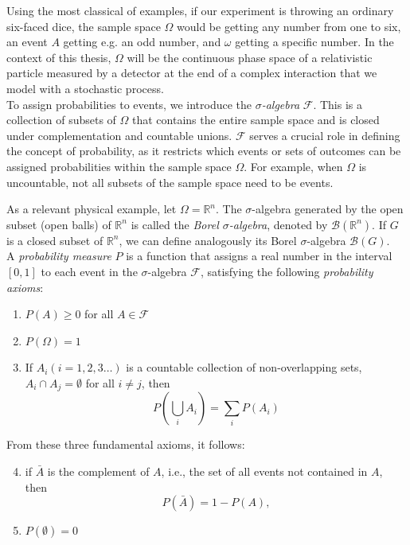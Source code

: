 \documentclass[a4paper,12pt]{book}
\begin{document}
Using the most classical of examples, if our experiment is throwing an ordinary six-faced dice, the sample space $\Omega$ would be getting any number from one to six, an event $A$ getting e.g. an odd number, and $\omega$ getting a specific number. In the context of this thesis, $\Omega$ will be the continuous phase space of a relativistic particle measured by a detector at the end of a complex interaction that we model with a stochastic process. \\

To assign probabilities to events, we introduce the \textit{$\sigma$-algebra} $\mathcal{F}$. This is a collection of subsets of $\Omega$ that contains the entire sample space and is closed under complementation and countable unions. $\mathcal{F}$ serves a crucial role in defining the concept of probability, as it restricts which events or sets of outcomes can be assigned probabilities within the sample space $\Omega$. For example, when $\Omega$ is uncountable, not all subsets of the sample space need to be events. 

As a relevant physical example, let $\Omega = \mathbb{R}^n $. The $\sigma$-algebra generated by the open subset (open balls) of $\mathbb{R}^n$ is called the \textit{Borel $\sigma$-algebra}, denoted by  $\mathcal{B}(\mathbb{R}^n)$. If $G$ is a closed subset of $\mathbb{R}^n$, we can define analogously its Borel $\sigma$-algebra $\mathcal{B}(G)$.\\


A \textit{probability measure} $P$ is a function that assigns a real number in the interval $[0, 1]$ to each event in the $\sigma$-algebra $\mathcal{F}$, satisfying the following \textit{probability axioms}: 
\begin{enumerate}[label=\roman*)]
    \item $P(A) \geq 0$ for all $A \in \mathcal{F}$ 
    \item $P(\Omega)=1$
    \item If $A_i(i=1,2,3 \ldots)$ is a countable collection of non-overlapping sets, $A_i \cap A_j=\emptyset$ for all $i \neq j$, then
$$
P\left(\bigcup_i A_i\right)=\sum_i P\left(A_i\right)
$$
\end{enumerate}

From these three fundamental axioms, it follows:

\begin{enumerate}[label=\roman*)]
  \setcounter{enumi}{3}
    \item  if $\bar{A}$ is the complement of $A$, i.e., the set of all events not contained in $A$, then
$$
P(\bar{A})=1-P(A),
$$
    \item $P(\emptyset)=0$
\end{enumerate}
\end{document}
